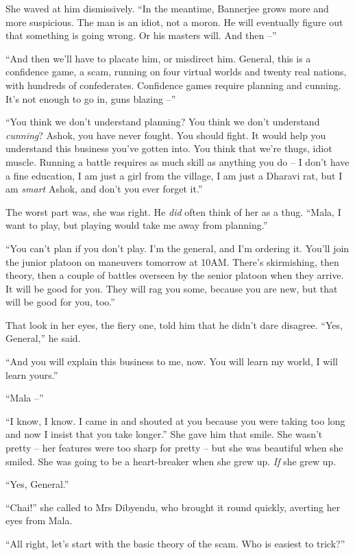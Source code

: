 She waved at him dismissively. ``In the meantime, Bannerjee grows
more and more suspicious. The man is an idiot, not a moron. He will
eventually figure out that something is going wrong. Or his masters
will. And then --''

``And then we'll have to placate him, or misdirect him. General,
this is a confidence game, a scam, running on four virtual worlds
and twenty real nations, with hundreds of confederates. Confidence
games require planning and cunning. It's not enough to go in, guns
blazing --''

``You think we don't understand planning? You think we don't
understand \emph{cunning}? Ashok, you have never fought. You should
fight. It would help you understand this business you've gotten
into. You think that we're thugs, idiot muscle. Running a battle
requires as much skill as anything you do -- I don't have a fine
education, I am just a girl from the village, I am just a Dharavi
rat, but I am \emph{smart} Ashok, and don't you ever forget it.''

The worst part was, she was right. He \emph{did} often think of her
as a thug. ``Mala, I want to play, but playing would take me away
from planning.''

``You can't plan if you don't play. I'm the general, and I'm
ordering it. You'll join the junior platoon on maneuvers tomorrow
at 10AM. There's skirmishing, then theory, then a couple of battles
overseen by the senior platoon when they arrive. It will be good
for you. They will rag you some, because you are new, but that will
be good for you, too.''

That look in her eyes, the fiery one, told him that he didn't dare
disagree. ``Yes, General,'' he said.

``And you will explain this business to me, now. You will learn my
world, I will learn yours.''

``Mala --''

``I know, I know. I came in and shouted at you because you were
taking too long and now I insist that you take longer.'' She gave
him that smile. She wasn't pretty -- her features were too sharp
for pretty -- but she was beautiful when she smiled. She was going
to be a heart-breaker when she grew up. \emph{If} she grew up.

``Yes, General.''

``Chai!'' she called to Mrs Dibyendu, who brought it round quickly,
averting her eyes from Mala.

``All right, let's start with the basic theory of the scam. Who is
easiest to trick?''

